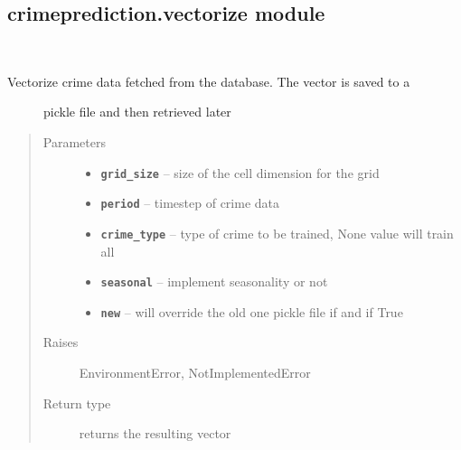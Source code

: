 \documentclass[letterpaper,10pt,english]{sphinxmanual}
\begin{document}
\subsection{crimeprediction.vectorize module}
\label{api/crimeprediction:module-crimeprediction.vectorize}\label{api/crimeprediction:crimeprediction-vectorize-module}

\begin{fulllineitems}
\label{api/crimeprediction:crimeprediction.vectorize.vectorize}~\begin{description}
\item[{Vectorize crime data fetched from the database. The vector is saved to a}] \leavevmode
pickle file and then retrieved later

\end{description}
\begin{quote}\begin{description}
\item[{Parameters}] \leavevmode\begin{itemize}
\item {} 
\textbf{\texttt{grid\_size}} -- size of the cell dimension for the grid

\item {} 
\textbf{\texttt{period}} -- timestep of crime data

\item {} 
\textbf{\texttt{crime\_type}} -- type of crime to be trained, None value will
train all

\item {} 
\textbf{\texttt{seasonal}} -- implement seasonality or not

\item {} 
\textbf{\texttt{new}} -- will override the old one pickle file if and if True

\end{itemize}

\item[{Raises}] \leavevmode
EnvironmentError, NotImplementedError

\item[{Return type}] \leavevmode
returns the resulting vector

\end{description}\end{quote}

\end{fulllineitems}
\end{document}
